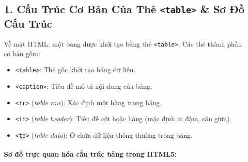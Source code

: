 \documentclass[11pt,oneside]{book}
\newcommand{\codeinline}[1]{\textcolor{accentOrange}{\texttt{#1}}}
\begin{document}
\subsection{1. Cấu Trúc Cơ Bản Của Thẻ \codeinline{<table>} \& Sơ Đồ Cấu Trúc}

Về mặt HTML, một bảng được khởi tạo bằng thẻ \codeinline{<table>}. Các thẻ thành phần cơ bản gồm:
\begin{itemize}[leftmargin=1.8em, itemsep=2pt, parsep=0pt]
    \item \codeinline{<table>}: Thẻ gốc khởi tạo bảng dữ liệu.
    \item \codeinline{<caption>}: Tiêu đề mô tả nội dung của bảng.
    \item \codeinline{<tr>} (\textit{table row}): Xác định một hàng trong bảng.
    \item \codeinline{<th>} (\textit{table header}): Tiêu đề cột hoặc hàng (mặc định in đậm, căn giữa).
    \item \codeinline{<td>} (\textit{table data}): Ô chứa dữ liệu thông thường trong bảng.
\end{itemize}

\paragraph{Sơ đồ trực quan hóa cấu trúc bảng trong HTML5:}
\end{document}
